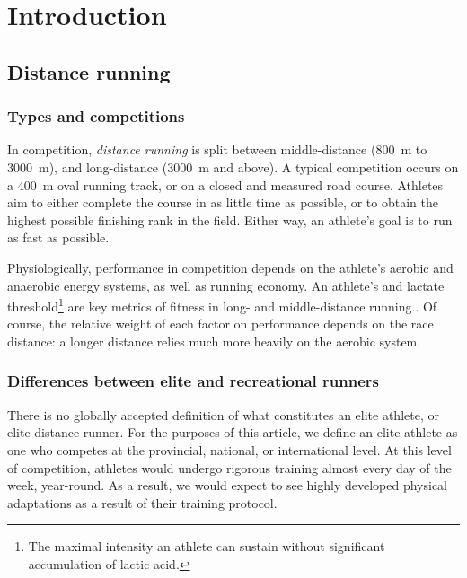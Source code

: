 \chapter{Introduction}
\section{Distance running}
    \subsection{Types and competitions}
In competition, \textit{distance running} is split between middle-distance (\SI{800}{m} to \SI{3000}{m}), and long-distance (\SI{3000}{m} and above). A typical competition occurs on a \SI{400}{m} oval running track, or on a closed and measured road course. Athletes aim to either complete the course in as little time as possible, or to obtain the highest possible finishing rank in the field. Either way, an athlete's goal is to run as fast as possible.

Physiologically, performance in competition depends on the athlete's aerobic and anaerobic energy systems, as well as running economy\cite[1]{brandon1995physiological}. An athlete's \votmax and lactate threshold\footnote{The maximal intensity an athlete can sustain without significant accumulation of lactic acid.} are key metrics of fitness in long- and middle-distance running.\cite[9]{brandon1995physiological}. Of course, the relative weight of each factor on performance depends on the race distance: a longer distance relies much more heavily on the aerobic system.
    \subsection{Differences between elite and recreational runners}
There is no globally accepted definition of what constitutes an elite athlete, or elite distance runner. For the purposes of this article, we define an elite athlete as one who competes at the provincial, national, or international level. At this level of competition, athletes would undergo rigorous training almost every day of the week, year-round. As a result, we would expect to see highly developed physical adaptations as a result of their training protocol. 

